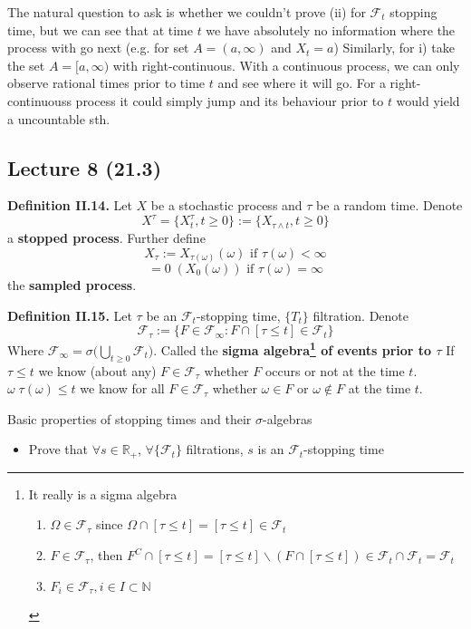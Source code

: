 \documentclass[english]{article}
\newcommand{\R}{\mathbb{R}}
\newcommand{\N}{\mathbb{N}}
\newcommand{\bs}{\backslash}
\newcommand{\note}[1]{\noindent\textbf{#1}}
\newcommand{\F}{\mathcal F}
\begin{document}
The natural question to ask is whether we couldn't prove (ii) for $\F_t$ stopping time, but we can see that at time $t$ we have absolutely no information where the process with go next (e.g. for set $A=(a,\infty)$ and $X_t=a$) \newline
Similarly, for i) take the set $A=[a, \infty)$ with right-continuous. With a continuous process, we can only observe rational times prior to time $t$ and see where it will go. For a right-continuouss process it could simply jump and its behaviour prior to $t$ would yield a uncountable sth.

\subsection*{Lecture 8 (21.3)}
\note{Definition II.14.} Let $X$ be a stochastic process and $\tau$ be a random time. Denote
$$X^\tau = \{ X^\tau_t, t\geq 0\} := \{X_{\tau \wedge t}, t\geq 0\}$$
a \textbf{stopped process}. Further define
$$X_\tau := X_{\tau(\omega)}(\omega) \text{ if }\tau(\omega) < \infty$$
$$ = 0 \; (X_0(\omega)) \text{ if }\tau (\omega) = \infty$$
the \textbf{sampled process}. \newline

\note{Definition II.15.}  Let $\tau$ be an $\F_t$-stopping time, $\{T_t\}$ filtration. Denote
$$\F_\tau := \{ F \in \F_\infty: F\cap [\tau \leq t] \in \F_t \}$$
Where $\F_\infty = \sigma \Big(\bigcup_{t\geq 0} \F_t \Big)$. Called the \textbf{sigma algebra\footnote{It really is a sigma algebra \begin{enumerate}
\item $\Omega \in \F_\tau$ since $\Omega\cap[\tau \leq t] = [\tau \leq t] \in \F_t$
\item $F \in \F_\tau$, then $F^C \cap [\tau \leq t] = [\tau \leq t ] \bs (F\cap [\tau \leq t]) \in \F_t \cap \F_t = \F_t$
\item $F_i \in \F_\tau, i\in I \subset \N$
\end{enumerate}} of events prior to $\tau$}
If $\tau \leq t$ we know (about any) $F\in \F_\tau$ whether $F$ occurs or not at the time $t$. \newline
$\omega\; \tau(\omega)\leq t$ we know for all $F\in \F_\tau$ whether $\omega \in F$ or $\omega \notin F$ at the time $t$. \newline

Basic properties of stopping times and their $\sigma$-algebras \begin{itemize}
\item Prove that $\forall s \in \R_+$, $\forall \{\F_t\}$ filtrations, $s$ is an $\F_t$-stopping time
\end{itemize}
\end{document}
